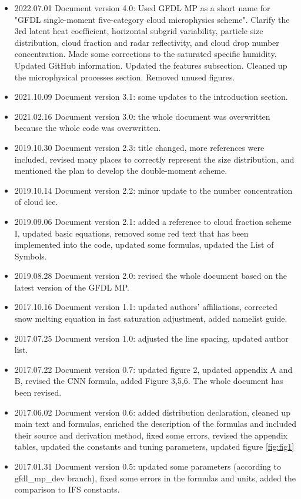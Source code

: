 \documentclass[letterpaper,titlepage,10pt]{article}
\numberwithin{equation}{section}
\begin{document}
\begin{appendices}
\begin{itemize}
	\setlength\itemsep{0em}
	\item 2022.07.01 Document version 4.0: Used GFDL MP as a short name for "GFDL single-moment five-category cloud microphysics scheme". Clarify the 3rd latent heat coefficient, horizontal subgrid variability, particle size distribution, cloud fraction and radar reflectivity, and cloud drop number concentration. Made some corrections to the saturated specific humidity. Updated GitHub information. Updated the features subsection. Cleaned up the microphysical processes section. Removed unused figures.
	\item 2021.10.09 Document version 3.1: some updates to the introduction section.
	\item 2021.02.16 Document version 3.0: the whole document was overwritten because the whole code was overwritten.
	\item 2019.10.30 Document version 2.3: title changed, more references were included, revised many places to correctly represent the size distribution, and mentioned the plan to develop the double-moment scheme.
	\item 2019.10.14 Document version 2.2: minor update to the number concentration of cloud ice.
	\item 2019.09.06 Document version 2.1: added a reference to cloud fraction scheme I, updated basic equations, removed some red text that has been implemented into the code, updated some formulas, updated the List of Symbols.
	\item 2019.08.28 Document version 2.0: revised the whole document based on the latest version of the GFDL MP.
	\item 2017.10.16 Document version 1.1: updated authors' affiliations, corrected snow melting equation in fast saturation adjustment, added namelist guide.
	\item 2017.07.25 Document version 1.0: adjusted the line spacing, updated author list.
	\item 2017.07.22 Document version 0.7: updated figure 2, updated appendix A and B, revised the CNN formula, added Figure 3,5,6. The whole document has been revised. 
	\item 2017.06.02 Document version 0.6: added distribution declaration, cleaned up main text and formulas, enriched the description of the formulas and included their source and derivation method, fixed some errors, revised the appendix tables, updated the constants and tuning parameters, updated figure \ref{fig:fig1}
	\item 2017.01.31 Document version 0.5: updated some parameters (according to gfdl\_mp\_dev branch), fixed some errors in the formulas and units, added the comparison to IFS constants.

\end{itemize}
\end{appendices}
\end{document}
